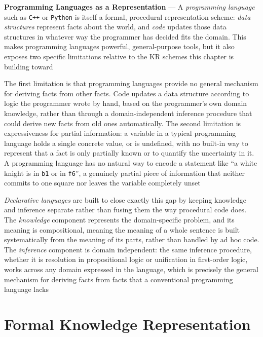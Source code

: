 \textbf{Programming Languages as a Representation} --- A \emph{programming
language} such as \texttt{C++} or \texttt{Python} is itself a formal,
procedural representation scheme: \emph{data structures} represent facts
about the world, and \emph{code} updates those data structures in whatever
way the programmer has decided fits the domain. This makes programming
languages powerful, general-purpose tools, but it also exposes two specific
limitations relative to the KR schemes this chapter is building toward

The first limitation is that programming languages provide no general
mechanism for deriving facts from other facts. Code updates a data
structure according to logic the programmer wrote by hand, based on the
programmer's own domain knowledge, rather than through a domain-independent
inference procedure that could derive new facts from old ones automatically.
The second limitation is expressiveness for partial information: a variable
in a typical programming language holds a single concrete value, or is
undefined, with no built-in way to represent that a fact is only partially
known or to quantify the uncertainty in it. A programming language has no
natural way to encode a statement like ``a white knight is in \texttt{b1}
or in \texttt{f6}'', a genuinely partial piece of information that neither
commits to one square nor leaves the variable completely unset

\emph{Declarative languages} are built to close exactly this gap by keeping
knowledge and inference separate rather than fusing them the way procedural
code does. The \emph{knowledge} component represents the domain-specific
problem, and its meaning is compositional, meaning the meaning of a whole
sentence is built systematically from the meaning of its parts, rather than
handled by ad hoc code. The \emph{inference} component is domain
independent: the same inference procedure, whether it is resolution in
propositional logic or unification in first-order logic, works across any
domain expressed in the language, which is precisely the general mechanism
for deriving facts from facts that a conventional programming language
lacks

\section{Formal Knowledge Representation}
\label{sec:formal-knowledge-representation}

